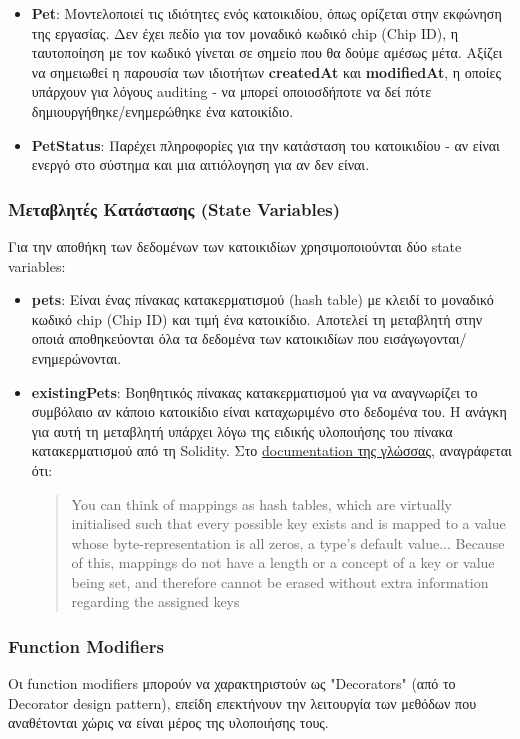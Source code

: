 \documentclass[12pt,a4paper]{article}
\begin{document}
\begin{itemize}
    \item \textbf{Pet}: Μοντελοποιεί τις ιδιότητες ενός κατοικιδίου, όπως ορίζεται στην εκφώνηση της εργασίας. Δεν έχει πεδίο για τον μοναδικό κωδικό chip (Chip ID), η ταυτοποίηση με τον κωδικό γίνεται σε σημείο που θα δούμε αμέσως μέτα. Αξίζει να σημειωθεί η παρουσία των ιδιοτήτων \textbf{createdAt} και \textbf{modifiedAt}, η οποίες υπάρχουν για λόγους auditing - να μπορεί οποιοσδήποτε να δεί πότε δημιουργήθηκε/ενημερώθηκε ένα κατοικίδιο.
    
    \item \textbf{PetStatus}: Παρέχει πληροφορίες για την κατάσταση του κατοικιδίου - αν είναι ενεργό στο σύστημα και μια αιτιόλογηση για αν δεν είναι.
\end{itemize}

\subsubsection{Μεταβλητές Κατάστασης (State Variables)}
Για την αποθήκη των δεδομένων των κατοικιδίων χρησιμοποιούνται δύο state variables:

\begin{itemize}
    \item \textbf{pets}: Είναι ένας πίνακας κατακερματισμού (hash table) με κλειδί το μοναδικό κωδικό chip (Chip ID) και τιμή ένα κατοικίδιο. Αποτελεί τη μεταβλητή στην οποιά αποθηκεύονται όλα τα δεδομένα των κατοικιδίων που εισάγωγονται/ενημερώνονται.\
    \item \textbf{existingPets}: Βοηθητικός πίνακας κατακερματισμού για να αναγνωρίζει το συμβόλαιο αν κάποιο κατοικίδιο είναι καταχωριμένο στο δεδομένα του. Η ανάγκη για αυτή τη μεταβλητή υπάρχει λόγω της ειδικής υλοποιήσης του πίνακα κατακερματισμού από τη Solidity. Στο  \href{https://docs.soliditylang.org/en/v0.8.30/types.html#mapping-types}{documentation της γλώσσας}, αναγράφεται ότι: \begin{quote}
        You can think of mappings as hash tables, which are virtually initialised such that every possible key exists and is mapped to a value whose byte-representation is all zeros, a type’s default value... Because of this, mappings do not have a length or a concept of a key or value being set, and therefore cannot be erased without extra information regarding the assigned keys
    \end{quote}
\end{itemize}

\subsubsection{Function Modifiers}
Οι function modifiers μπορούν να χαρακτηριστούν ως "Decorators" (από το Decorator design pattern), επείδη επεκτήνουν την λειτουργία των μεθόδων που αναθέτονται χώρις να είναι μέρος της υλοποιήσης τους.
\end{document}
